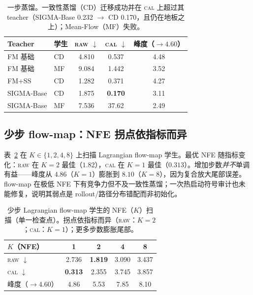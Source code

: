\documentclass[11pt]{ctexart}
\newcommand{\raw}{\textsc{raw}}
\renewcommand{\cal}{\textsc{cal}}
\newcommand{\best}[1]{\textbf{#1}}
\begin{document}
\begin{table}[t]
\centering
\caption{一步蒸馏。一致性蒸馏（CD）迁移成功并在 \cal{} 上超过其 teacher（SIGMA-Base 0.232 $\to$ CD 0.170，且仍在地板之上）；Mean-Flow（MF）失败。}
\label{tab:distill}
\small
\begin{tabular}{l l c c c}
\toprule
Teacher & 学生 & \raw{} $\downarrow$ & \cal{} $\downarrow$ & 峰度（$\to 4.60$） \\
\midrule
FM 基础        & CD & 4.810 & 0.537 & 4.48 \\
FM 基础        & MF & 9.084 & 1.442 & 3.52 \\
FM+SS          & CD & 1.282 & 0.371 & 4.27 \\
SIGMA-Base     & CD & 1.875 & \best{0.170} & 3.11 \\
SIGMA-Base     & MF & 7.536 & 37.62 & 2.49 \\
\bottomrule
\end{tabular}
\end{table}

\subsection{少步 flow-map：NFE 拐点依指标而异}
\label{sec:results-nfe}
表~\ref{tab:nfe} 在 $K\in\{1,2,4,8\}$ 上扫描 Lagrangian flow-map 学生。最优 NFE 随指标变化：\raw{} 在 $K{=}2$ 最佳（$1.82$），\cal{} 在 $K{=}1$ 最佳（$0.313$）。增加步数\emph{并不}单调有益——峰度从 $4.86$（$K{=}1$）膨胀到 $8.10$（$K{=}8$），因为复合放大尾部误差。flow-map 在极低 NFE 下有竞争力但不及一致性蒸馏；一次热启动符号审计也未能修复，说明其弱点是 rollout/路径分布错配而非初始化。

\begin{table}[t]
\centering
\caption{少步 Lagrangian flow-map 学生的 NFE（$K$）扫描（单一检查点）。拐点依指标而异（\raw{}：$K{=}2$；\cal{}：$K{=}1$）；更多步数膨胀尾部。}
\label{tab:nfe}
\small
\begin{tabular}{l c c c c}
\toprule
$K$（NFE） & 1 & 2 & 4 & 8 \\
\midrule
\raw{} $\downarrow$  & 2.736 & \best{1.819} & 3.090 & 3.437 \\
\cal{} $\downarrow$  & \best{0.313} & 2.355 & 3.745 & 3.857 \\
峰度（$\to 4.60$） & 4.86 & 5.53 & 7.85 & 8.10 \\
\bottomrule
\end{tabular}
\end{table}

\end{document}
